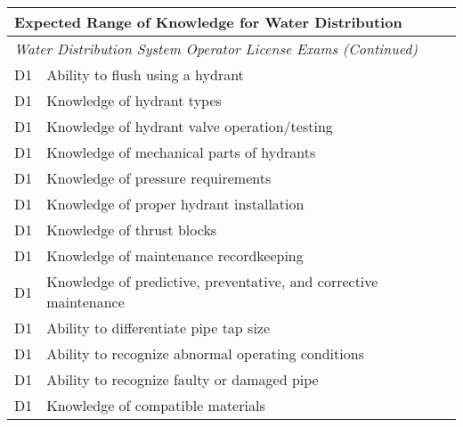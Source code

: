 \begin{table}[H]
\begin{tabular}{| m{1cm} |m{15cm} |}
\hline
\multicolumn{2}{|l|}{\textbf{Expected   Range of Knowledge for Water Distribution}}                                                                      \\ \hline
\multicolumn{2}{|l|}{\textit{Water   Distribution System Operator License Exams (Continued)}}                                                                  \\ \hline
D1 & Ability to flush   using a hydrant                                                                             \\ \hline
D1 & Knowledge of hydrant   types                                                                                   \\ \hline
D1 & Knowledge of hydrant   valve operation/testing                                                                 \\ \hline
D1 & Knowledge of   mechanical parts of hydrants                                                                    \\ \hline
D1 & Knowledge of pressure   requirements                                                                           \\ \hline
D1 & Knowledge of proper   hydrant installation                                                                     \\ \hline
D1 & Knowledge of thrust   blocks                                                                                   \\ \hline
D1 & Knowledge of   maintenance recordkeeping                                                                       \\ \hline
D1 & Knowledge of   predictive, preventative, and corrective maintenance                                            \\ \hline
D1 & Ability to   differentiate pipe tap size                                                                       \\ \hline
D1 & Ability to recognize   abnormal operating conditions                                                           \\ \hline
D1 & Ability to recognize   faulty or damaged pipe                                                                  \\ \hline
D1 & Knowledge of   compatible materials                                                                            \\ \hline

\end{tabular}
\end{table}
